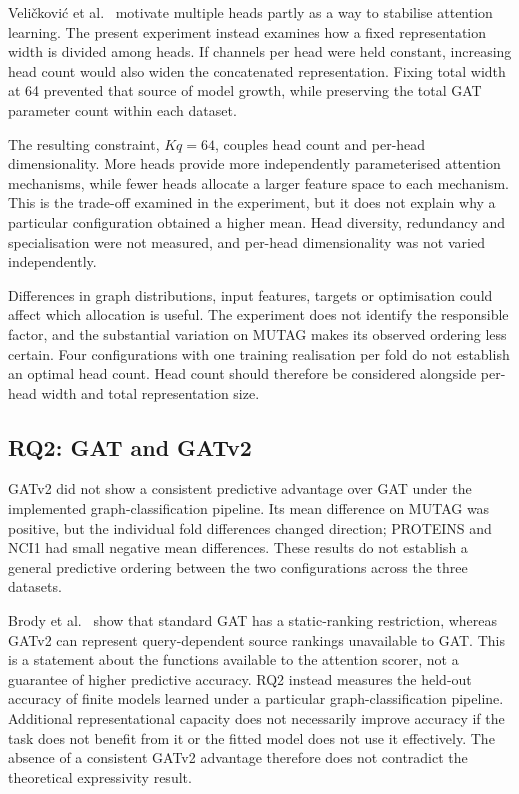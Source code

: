 \documentclass[11pt,a4paper]{article}
\begin{document}
Veli\v{c}kovi\'{c} et al.~\cite{velickovic2018gat} motivate multiple heads partly as a way to stabilise attention learning. The present experiment instead examines how a fixed representation width is divided among heads. If channels per head were held constant, increasing head count would also widen the concatenated representation. Fixing total width at 64 prevented that source of model growth, while preserving the total GAT parameter count within each dataset.

The resulting constraint, \(Kq=64\), couples head count and per-head dimensionality. More heads provide more independently parameterised attention mechanisms, while fewer heads allocate a larger feature space to each mechanism. This is the trade-off examined in the experiment, but it does not explain why a particular configuration obtained a higher mean. Head diversity, redundancy and specialisation were not measured, and per-head dimensionality was not varied independently.

Differences in graph distributions, input features, targets or optimisation could affect which allocation is useful. The experiment does not identify the responsible factor, and the substantial variation on MUTAG makes its observed ordering less certain. Four configurations with one training realisation per fold do not establish an optimal head count. Head count should therefore be considered alongside per-head width and total representation size.

\subsection{RQ2: GAT and GATv2}
\label{sec:discussion-rq2}

GATv2 did not show a consistent predictive advantage over GAT under the implemented graph-classification pipeline. Its mean difference on MUTAG was positive, but the individual fold differences changed direction; PROTEINS and NCI1 had small negative mean differences. These results do not establish a general predictive ordering between the two configurations across the three datasets.

Brody et al.~\cite{brody2022attentive} show that standard GAT has a static-ranking restriction, whereas GATv2 can represent query-dependent source rankings unavailable to GAT. This is a statement about the functions available to the attention scorer, not a guarantee of higher predictive accuracy. RQ2 instead measures the held-out accuracy of finite models learned under a particular graph-classification pipeline. Additional representational capacity does not necessarily improve accuracy if the task does not benefit from it or the fitted model does not use it effectively. The absence of a consistent GATv2 advantage therefore does not contradict the theoretical expressivity result.
\end{document}
